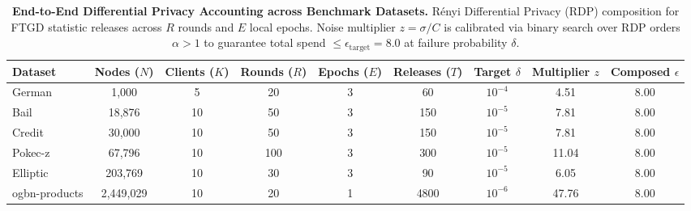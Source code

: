\begin{table}[t]
\centering
\small
\caption{\textbf{End-to-End Differential Privacy Accounting across Benchmark Datasets.}
R\'{e}nyi Differential Privacy (RDP) composition for FTGD statistic releases across $R$ rounds and $E$ local epochs.
Noise multiplier $z = \sigma / C$ is calibrated via binary search over RDP orders $\alpha > 1$ to guarantee total spend $\le \epsilon_{\text{target}} = 8.0$ at failure probability $\delta$.}
\label{tab:dp_accounting}
\begin{tabular}{lcccccccc}
\toprule
\textbf{Dataset} & \textbf{Nodes ($N$)} & \textbf{Clients ($K$)} & \textbf{Rounds ($R$)} & \textbf{Epochs ($E$)} & \textbf{Releases ($T$)} & \textbf{Target $\delta$} & \textbf{Multiplier $z$} & \textbf{Composed $\epsilon$} \\
\midrule
German & 1,000 & 5 & 20 & 3 & 60 & $10^{-4}$ & 4.51 & 8.00 \\
Bail & 18,876 & 10 & 50 & 3 & 150 & $10^{-5}$ & 7.81 & 8.00 \\
Credit & 30,000 & 10 & 50 & 3 & 150 & $10^{-5}$ & 7.81 & 8.00 \\
Pokec-z & 67,796 & 10 & 100 & 3 & 300 & $10^{-5}$ & 11.04 & 8.00 \\
Elliptic & 203,769 & 10 & 30 & 3 & 90 & $10^{-5}$ & 6.05 & 8.00 \\
ogbn-products & 2,449,029 & 10 & 20 & 1 & 4800 & $10^{-6}$ & 47.76 & 8.00 \\
\bottomrule
\end{tabular}
\end{table}
